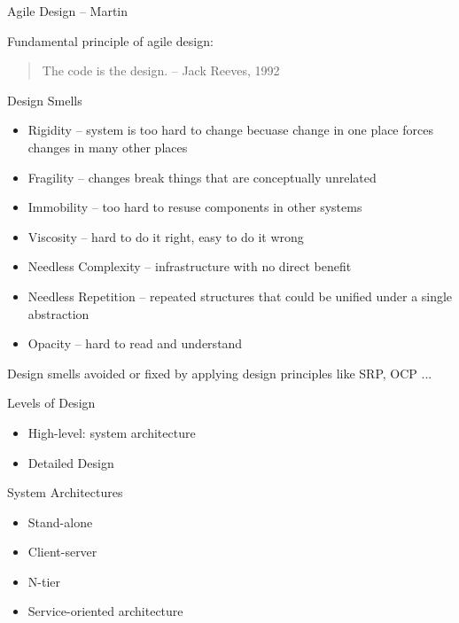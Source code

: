 \documentclass{beamer}
\begin{document}
\begin{frame}[fragile]{Agile Design -- Martin}


Fundamental principle of agile design:
\begin{quote}
The code is the design. -- Jack Reeves, 1992
\end{quote}

Design Smells
\begin{itemize}
\item Rigidity -- system is too hard to change becuase change in one place forces changes in many other places
\item Fragility -- changes break things that are conceptually unrelated
\item Immobility -- too hard to resuse components in other systems
\item Viscosity -- hard to do it right, easy to do it wrong
\item Needless Complexity -- infrastructure with no direct benefit
\item Needless Repetition -- repeated structures that could be unified under a single abstraction
\item Opacity -- hard to read and understand
\end{itemize}
Design smells avoided or fixed by applying design principles like SRP, OCP ...

\end{frame}

\begin{frame}[fragile]{Levels of Design}

\begin{itemize}
\item High-level: system architecture
\item Detailed Design
\end{itemize}


\end{frame}

\begin{frame}[fragile]{System Architectures}

\begin{itemize}
\item Stand-alone
\item Client-server
\item N-tier
\item Service-oriented architecture
\end{itemize}

\end{frame}
\end{document}
